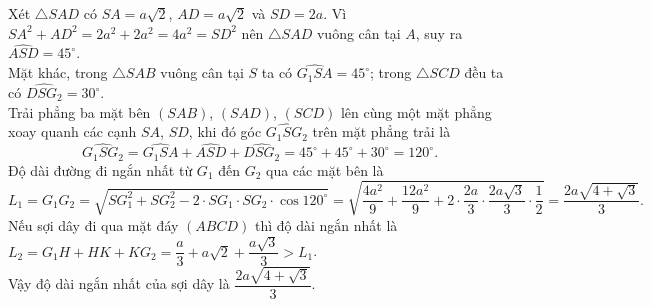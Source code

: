 \begin{ex}
{\begin{enumerate}[a)]
			Xét $\triangle SAD$ có $SA=a\sqrt{2}$, $AD=a\sqrt{2}$ và $SD=2a$. Vì $SA^2+AD^2=2a^2+2a^2=4a^2=SD^2$ nên $\triangle SAD$ vuông cân tại $A$, suy ra $\widehat{ASD}=45^{\circ}$.\\
			Mặt khác, trong $\triangle SAB$ vuông cân tại $S$ ta có $\widehat{G_1SA}=45^{\circ}$; trong $\triangle SCD$ đều ta có $\widehat{DSG_2}=30^{\circ}$.\\
			Trải phẳng ba mặt bên $(SAB)$, $(SAD)$, $(SCD)$ lên cùng một mặt phẳng xoay quanh các cạnh $SA$, $SD$, khi đó góc $\widehat{G_1SG_2}$ trên mặt phẳng trải là
			\[ \widehat{G_1SG_2}=\widehat{G_1SA}+\widehat{ASD}+\widehat{DSG_2}=45^{\circ}+45^{\circ}+30^{\circ}=120^{\circ}. \]
			Độ dài đường đi ngắn nhất từ $G_1$ đến $G_2$ qua các mặt bên là
			\[ L_1=G_1G_2=\sqrt{SG_1^2+SG_2^2-2\cdot SG_1\cdot SG_2\cdot\cos 120^{\circ}}=\sqrt{\dfrac{4a^2}{9}+\dfrac{12a^2}{9}+2\cdot\dfrac{2a}{3}\cdot\dfrac{2a\sqrt{3}}{3}\cdot\dfrac{1}{2}}=\dfrac{2a\sqrt{4+\sqrt{3}}}{3}. \]
			Nếu sợi dây đi qua mặt đáy $(ABCD)$ thì độ dài ngắn nhất là $L_2=G_1H+HK+KG_2=\dfrac{a}{3}+a\sqrt{2}+\dfrac{a\sqrt{3}}{3}>L_1$.\\
			Vậy độ dài ngắn nhất của sợi dây là $\dfrac{2a\sqrt{4+\sqrt{3}}}{3}$.
		\end{enumerate}
	}
\end{ex}

\dapan